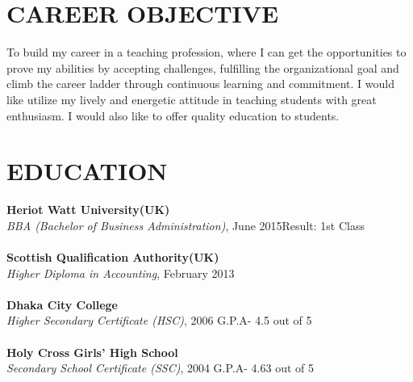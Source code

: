 \documentclass[margin]{res}
\begin{document}
\begin{resume}
%
\section{CAREER OBJECTIVE}
\par
To build my career in a teaching profession, where I can get the opportunities to prove my abilities by accepting challenges, fulfilling the organizational goal and climb the career ladder through continuous learning and commitment. I would like utilize my lively and energetic attitude in teaching students with great enthusiasm. I would also like to offer quality education to students.



\section{EDUCATION}
\textbf{Heriot Watt University(UK)}\\
{\sl BBA (Bachelor of Business Administration)}, June 2015\hfill Result: 
1st Class
\\ \\
\textbf{Scottish Qualification Authority(UK)}\\
{\sl Higher Diploma in Accounting}, February 2013 
\\ \\
\textbf{Dhaka City College}\\
{\sl Higher Secondary Certificate (HSC)}, 2006 \hfill G.P.A- 4.5 out of 5
\\ \\
\textbf{Holy Cross Girls' High School}\\
{\sl Secondary School Certificate (SSC)}, 2004 \hfill G.P.A- 4.63 out of 5




\end{resume}
\end{document}

